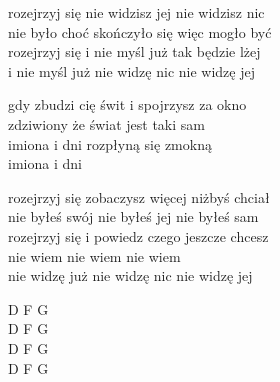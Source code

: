 \begin{text}
    rozejrzyj się nie widzisz jej nie widzisz nic\\
    nie było choć skończyło się więc mogło być\\
    rozejrzyj się i nie myśl już tak będzie lżej\\
    i nie myśl już nie widzę nic nie widzę jej

    gdy zbudzi cię świt i spojrzysz za okno\\
    zdziwiony że świat jest taki sam\\
    imiona i dni rozpłyną się zmokną\\
    imiona i dni

    rozejrzyj się zobaczysz więcej niżbyś chciał\\
    nie byłeś swój nie byłeś jej nie byłeś sam\\
    rozejrzyj się i powiedz czego jeszcze chcesz\\
    nie wiem nie wiem nie wiem\\
    nie widzę już nie widzę nic nie widzę jej
\end{text}
\begin{chord}
    D F G\\
    D F G\\
    D F G\\
    D F G
\end{chord}